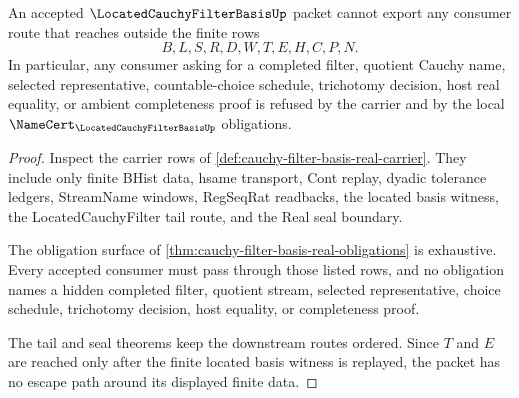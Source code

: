 \begin{theorem}
\label{thm:cauchy-filter-basis-real-nonescape}
An accepted $\LocatedCauchyFilterBasisUp$ packet cannot export any consumer route that reaches outside the finite rows
$$
B,L,S,R,D,W,T,E,H,C,P,N.
$$
In particular, any consumer asking for a completed filter, quotient Cauchy name, selected representative, countable-choice schedule, trichotomy decision, host real equality, or ambient completeness proof is refused by the carrier and by the local $\NameCert_{\LocatedCauchyFilterBasisUp}$ obligations.
\end{theorem}
\begin{proof}
Inspect the carrier rows of \autoref{def:cauchy-filter-basis-real-carrier}. They include only finite BHist data, hsame transport, Cont replay, dyadic tolerance ledgers, StreamName windows, RegSeqRat readbacks, the located basis witness, the LocatedCauchyFilter tail route, and the Real seal boundary.

The obligation surface of \autoref{thm:cauchy-filter-basis-real-obligations} is exhaustive. Every accepted consumer must pass through those listed rows, and no obligation names a hidden completed filter, quotient stream, selected representative, choice schedule, trichotomy decision, host equality, or completeness proof.

The tail and seal theorems keep the downstream routes ordered. Since $T$ and $E$ are reached only after the finite located basis witness is replayed, the packet has no escape path around its displayed finite data.
\end{proof}

\begin{closurestatus}{\LocatedCauchyFilterBasisUp}
  \theoryclosure{\seedClosure}
  \formalstatus{\unformalizedV}
\end{closurestatus}
